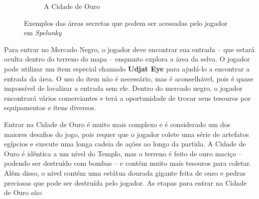 \begin{figure}[htb!]
\begin{subfigure}[b]{0.4\textwidth}
		\caption{A Cidade de Ouro}
		\label{fig:spelunky-cityofgold}
	\end{subfigure}
	\caption{Exemplos das áreas secretas que podem ser acessadas pelo jogador em
	\textit{Spelunky}}
	\label{fig:spelunky-secret-areas}
\end{figure}


Para entrar no Mercado Negro, o jogador deve encontrar sua entrada -- que estará
oculta dentro do terreno do mapa -- enquanto explora a área da selva. O jogador
pode utilizar um item especial chamado \textbf{Udjat Eye} para ajudá-lo a
encontrar a entrada da área. O uso do item não é necessário, mas é aconselhável,
pois é quase impossível de localizar a entrada sem ele. Dentro do mercado negro,
o jogador encontrará vários comerciantes e terá a oportunidade de trocar seus
tesouros por equipamentos e itens diversos.

Entrar na Cidade de Ouro é muito mais complexo e é considerado um dos maiores
desafios do jogo, pois requer que o jogador colete uma série de artefatos
egípcios e execute uma longa cadeia de ações ao longo da partida. A Cidade de
Ouro é idêntica a um nível do Templo, mas o terreno é feito de ouro maciço --
podendo ser destruído com bombas -- e contém muito mais tesouros para coletar.
Além disso, o nível contém uma estátua dourada gigante feita de ouro e pedras
preciosas que pode ser destruída pelo jogador. As etapas para entrar na Cidade
de Ouro são:

